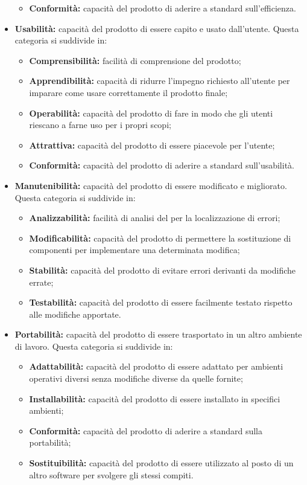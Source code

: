 \documentclass{scalatekids-article}
\begin{document}
\begin{itemize}
\begin{itemize}
  \item{\textbf{Conformità:} capacità del prodotto di aderire a standard sull'efficienza.}
  \end{itemize}
\item{\textbf{Usabilità:} capacità del prodotto di essere capito e usato dall'utente. Questa categoria si suddivide in:}
  \begin{itemize}
  \item{\textbf{Comprensibilità:} facilità di comprensione del prodotto;}
  \item{\textbf{Apprendibilità:} capacità di ridurre l'impegno richiesto all'utente per imparare come usare correttamente il prodotto finale;}
  \item{\textbf{Operabilità:} capacità del prodotto di fare in modo che gli utenti riescano a farne uso per i propri scopi;}
  \item{\textbf{Attrattiva:} capacità del prodotto di essere piacevole per l'utente;}
  \item{\textbf{Conformità:} capacità del prodotto di aderire a standard sull'usabilità.}
  \end{itemize}
\item{\textbf{Manutenibilità:} capacità del prodotto di essere modificato e migliorato. Questa categoria si suddivide in:}
  \begin{itemize}
  \item{\textbf{Analizzabilità:} facilità di analisi del  per la localizzazione di errori;}
  \item{\textbf{Modificabilità:} capacità del prodotto di permettere la sostituzione di componenti per implementare una determinata modifica;}
  \item{\textbf{Stabilità:} capacità del prodotto di evitare errori derivanti da modifiche errate;}
  \item{\textbf{Testabilità:} capacità del prodotto di essere facilmente testato rispetto alle modifiche apportate.}
  \end{itemize}
\item{\textbf{Portabilità:} capacità del prodotto di essere trasportato in un altro ambiente di lavoro. Questa categoria si suddivide in:}
  \begin{itemize}
  \item{\textbf{Adattabilità:} capacità del prodotto di essere adattato per ambienti operativi diversi senza modifiche diverse da quelle fornite;}
  \item{\textbf{Installabilità:} capacità del prodotto di essere installato in specifici ambienti;}
  \item{\textbf{Conformità:} capacità del prodotto di aderire a standard sulla portabilità;}
  \item{\textbf{Sostituibilità:} capacità del prodotto di essere utilizzato al posto di un altro software per svolgere gli stessi compiti.}
  \end{itemize}
\end{itemize}
\newpage
\end{document}
